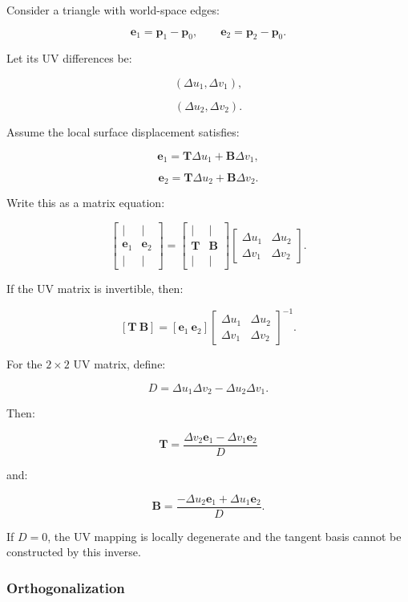 Consider a triangle with world-space edges:

\[
 \mathbf e_1=\mathbf p_1-\mathbf p_0, \qquad \mathbf e_2=\mathbf p_2-\mathbf p_0.
\]

Let its UV differences be:

\[
 (\Delta u_1,\Delta v_1),
\]

\[
 (\Delta u_2,\Delta v_2).
\]

Assume the local surface displacement satisfies:

\[
 \mathbf e_1=\mathbf T\Delta u_1+\mathbf B\Delta v_1,
\]

\[
 \mathbf e_2=\mathbf T\Delta u_2+\mathbf B\Delta v_2.
\]

Write this as a matrix equation:

\[
 \begin{bmatrix} |&|\\ \mathbf e_1&\mathbf e_2\\ |&| \end{bmatrix} = \begin{bmatrix} |&|\\ \mathbf T&\mathbf B\\ |&| \end{bmatrix} \begin{bmatrix} \Delta u_1&\Delta u_2\\ \Delta v_1&\Delta v_2 \end{bmatrix}.
\]

If the UV matrix is invertible, then:

\[
 \boxed{ [\mathbf T\ \mathbf B] = [\mathbf e_1\ \mathbf e_2] \begin{bmatrix} \Delta u_1&\Delta u_2\\ \Delta v_1&\Delta v_2 \end{bmatrix}^{-1} }.
\]

For the \(2\times2\) UV matrix, define:

\[
 D=\Delta u_1\Delta v_2-\Delta u_2\Delta v_1.
\]

Then:

\[
 \boxed{ \mathbf T= \frac{ \Delta v_2\mathbf e_1-\Delta v_1\mathbf e_2 }{D} }
\]

and:

\[
 \boxed{ \mathbf B= \frac{ -\Delta u_2\mathbf e_1+\Delta u_1\mathbf e_2 }{D} }.
\]

If \(D=0\), the UV mapping is locally degenerate and the tangent basis cannot be constructed by this inverse.

\subsubsection{Orthogonalization}\label{02-foundations-ii-ch032-orthogonalization}

